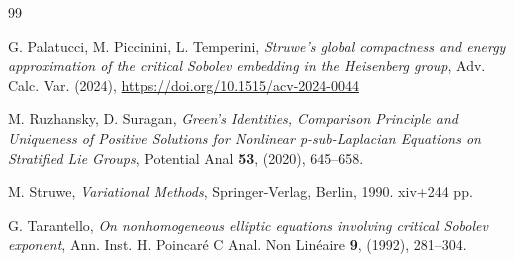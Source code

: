 \documentclass[11pt]{amsart}
\numberwithin{equation}{section} %
\theoremstyle{definition}
\begin{document}
\begin{thebibliography}{99}
	
	
	
	

	
	G. Palatucci, M. Piccinini, L. Temperini,	
	{\em Struwe's global compactness and energy approximation of the critical Sobolev embedding in the Heisenberg group},
	Adv. Calc. Var. (2024), \url{https://doi.org/10.1515/acv-2024-0044}
	
	
	
    M. Ruzhansky, D. Suragan, 
    {\em Green’s Identities, Comparison Principle and Uniqueness of Positive Solutions for Nonlinear p-sub-Laplacian Equations on Stratified Lie Groups}, 
    Potential Anal {\bf 53}, (2020), 645--658.
	
	
	M. Struwe, 
	{\em Variational Methods}, 
	Springer-Verlag, Berlin, 1990. xiv+244 pp.
	

	
	
	G. Tarantello, 
	{\em On nonhomogeneous elliptic equations involving critical Sobolev exponent}, 
	Ann. Inst. H. Poincar\'{e} C Anal. Non Lin\'{e}aire {\bf 9}, (1992), 281--304.
	

\end{thebibliography}
\end{document}
